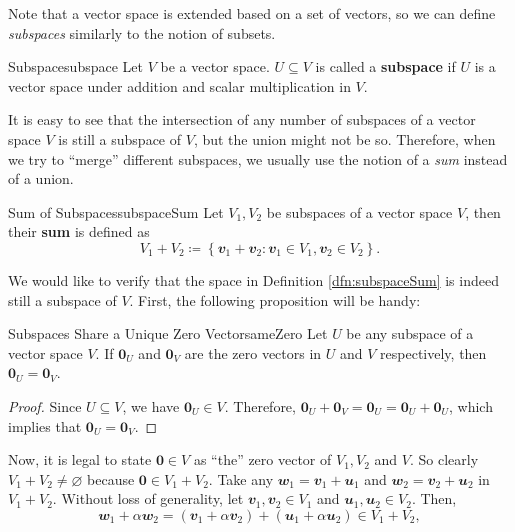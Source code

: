 \documentclass[math, code]{amznotes}
\theoremstyle{remark}
\newcommand{\zero}{\mathbf{0}}
\begin{document}
Note that a vector space is extended based on a set of vectors, so we can define \textit{subspaces} similarly to the notion of subsets.
\begin{dfnbox}{Subspace}{subspace}
    Let $V$ be a vector space. $U \subseteq V$ is called a {\color{red} \textbf{subspace}} if $U$ is a vector space under addition and scalar multiplication in $V$.
\end{dfnbox}
It is easy to see that the intersection of any number of subspaces of a vector space $V$ is still a subspace of $V$, but the union might not be so. Therefore, when we try to ``merge'' different subspaces, we usually use the notion of a \textit{sum} instead of a union. 
\begin{dfnbox}{Sum of Subspaces}{subspaceSum}
    Let $V_1, V_2$ be subspaces of a vector space $V$, then their {\color{red} \textbf{sum}} is defined as 
    \begin{equation*}
        V_1 + V_2 \coloneqq \left\{\mathbfit{v}_1 + \mathbfit{v}_2 \colon \mathbfit{v}_1 \in V_1, \mathbfit{v}_2 \in V_2\right\}.
    \end{equation*}
\end{dfnbox}
We would like to verify that the space in Definition \ref{dfn:subspaceSum} is indeed still a subspace of $V$. First, the following proposition will be handy:
\begin{probox}{Subspaces Share a Unique Zero Vector}{sameZero}
    Let $U$ be any subspace of a vector space $V$. If $\zero_U$ and $\zero_V$ are the zero vectors in $U$ and $V$ respectively, then $\zero_U = \zero_V$.
    \tcblower
    \begin{proof}
        Since $U \subseteq V$, we have $\zero_U \in V$. Therefore, $\zero_U + \zero_V = \zero_U = \zero_U + \zero_U$, which implies that $\zero_U = \zero_V$.
    \end{proof}
\end{probox} 
Now, it is legal to state $\zero \in V$ as ``the'' zero vector of $V_1, V_2$ and $V$. So clearly $V_1 + V_2 \neq \varnothing$ because $\zero \in V_1 + V_2$. Take any $\mathbfit{w}_1 = \mathbfit{v}_1 + \mathbfit{u}_1$ and $\mathbfit{w}_2 = \mathbfit{v}_2 + \mathbfit{u}_2$ in $V_1 + V_2$. Without loss of generality, let $\mathbfit{v}_1, \mathbfit{v}_2 \in V_1$ and $\mathbfit{u}_1, \mathbfit{u}_2 \in V_2$. Then, 
\begin{equation*}
    \mathbfit{w}_1 + \alpha\mathbfit{w}_2 = (\mathbfit{v}_1 + \alpha\mathbfit{v}_2) + (\mathbfit{u}_1 + \alpha\mathbfit{u}_2) \in V_1 + V_2,
\end{equation*}
\end{document}
